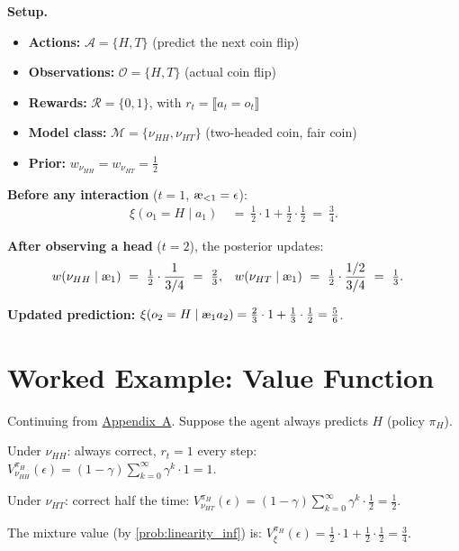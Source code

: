 \documentclass[fontsize=11pt, parskip=half]{scrartcl}
\newcommand{\cA}{\mathcal{A}}
\newcommand{\cO}{\mathcal{O}}
\newcommand{\cR}{\mathcal{R}}
\newcommand{\cM}{\mathcal{M}}
\newcommand{\aes}{\textnormal{\ae}}
\begin{document}
\begin{callout}[note]
\textbf{Setup.}
\begin{itemize}\itemsep=2pt
\item \textbf{Actions:} $\cA = \{H, T\}$ (predict the next coin flip)
\item \textbf{Observations:} $\cO = \{H, T\}$ (actual coin flip)
\item \textbf{Rewards:} $\cR = \{0, 1\}$, with $r_t = \llbracket a_t = o_t \rrbracket$
\item \textbf{Model class:} $\cM = \{\nu_{HH}, \nu_{HT}\}$ (two-headed coin, fair coin)
\item \textbf{Prior:} $w_{\nu_{HH}} = w_{\nu_{HT}} = \tfrac{1}{2}$
\end{itemize}
\end{callout}

\textbf{Before any interaction} ($t=1$, $\aes_{<1} = \epsilon$):
\begin{align*}
    \xi(o_1 = H \mid a_1) ~&=~ \tfrac{1}{2} \cdot 1 + \tfrac{1}{2} \cdot \tfrac{1}{2} ~=~ \tfrac{3}{4}.
\end{align*}

\textbf{After observing a head} ($t=2$), the posterior updates:
\begin{align*}
    w(\nu_{HH} \mid \aes_{1}) ~&=~ \tfrac{1}{2} \cdot \frac{1}{3/4} ~=~ \tfrac{2}{3}, &
    w(\nu_{HT} \mid \aes_{1}) ~&=~ \tfrac{1}{2} \cdot \frac{1/2}{3/4} ~=~ \tfrac{1}{3}.
\end{align*}

\textbf{Updated prediction:}
$\xi(o_2 = H \mid \aes_{1} a_2) = \tfrac{2}{3} \cdot 1 + \tfrac{1}{3} \cdot \tfrac{1}{2} = \tfrac{5}{6}$.


\section{Worked Example: Value Function}\label{sec:appendix_value}

Continuing from \hyperref[sec:appendix_mixture]{Appendix~A}. Suppose the agent always predicts $H$ (policy $\pi_H$).

Under $\nu_{HH}$: always correct, $r_t = 1$ every step:
$V_{\nu_{HH}}^{\pi_H}(\epsilon) = (1-\gamma) \sum_{k=0}^\infty \gamma^k \cdot 1 = 1$.

Under $\nu_{HT}$: correct half the time:
$V_{\nu_{HT}}^{\pi_H}(\epsilon) = (1-\gamma) \sum_{k=0}^\infty \gamma^k \cdot \tfrac{1}{2} = \tfrac{1}{2}$.

The mixture value (by \cref{prob:linearity_inf}) is:
$V_\xi^{\pi_H}(\epsilon) = \tfrac{1}{2} \cdot 1 + \tfrac{1}{2} \cdot \tfrac{1}{2} = \tfrac{3}{4}$.
\end{document}
